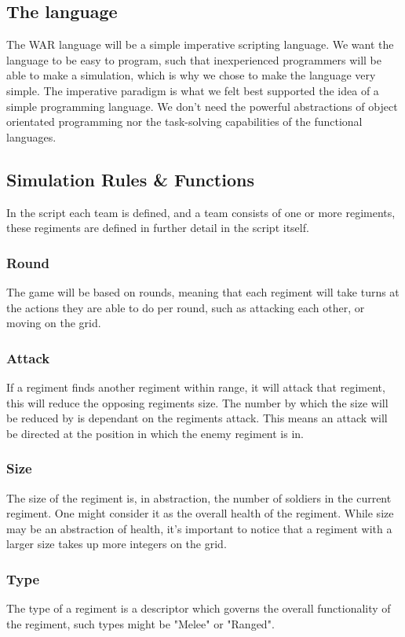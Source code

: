 	\subsection{The language}
		The WAR language will be a simple imperative scripting language. 
		We want the language to be easy to program, such that inexperienced programmers will be able to make a simulation, which is why we chose to
		make the language very simple. The imperative paradigm is what we felt best supported the idea of a simple programming language. We don't need the
		powerful abstractions of object orientated programming nor the task-solving capabilities of the functional languages.
		
		 
	\subsection{Simulation Rules \& Functions}
	In the script each team is defined, and a team consists of one or more regiments, these regiments are defined in further detail in the script itself.
	\subsubsection{Round}
	The game will be based on rounds, meaning that each regiment will take turns at the actions they are able to do per round, such as attacking each other, or moving on the grid.
	\subsubsection{Attack}
	If a regiment finds another regiment within range, it will attack that regiment, this will reduce the opposing regiments size. The number by which the size will be reduced by is dependant on the regiments attack. This means an attack will be directed at the position in which the enemy regiment is in.
		\subsubsection{Size}
		The size of the regiment is, in abstraction, the number of soldiers in the current regiment. One might consider it as the overall health of the regiment. While  size may be an abstraction of health, it's important to notice that a regiment with a larger size takes up more integers on the grid.
			\subsubsection{Type}
			The type of a regiment is a descriptor which governs the overall functionality of the regiment, such types might be "Melee" or "Ranged".
